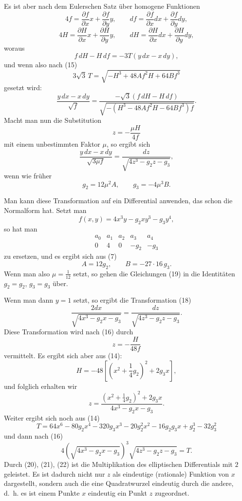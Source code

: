 \documentclass[11pt]{article}
\begin{document}
Es ist aber nach dem Eulerschen Satz über homogene Funktionen
\[
4f=\frac{\partial f}{\partial x}x+\frac{\partial f}{\partial y}y,\qquad
df=\frac{\partial f}{\partial x}dx+\frac{\partial f}{\partial y}dy,
\]
\[
4H=\frac{\partial H}{\partial x}x+\frac{\partial H}{\partial y}y,\qquad
dH=\frac{\partial H}{\partial x}dx+\frac{\partial H}{\partial y}dy,
\]
woraus
\[
f\,dH-H\,df=-3T(y\,dx-x\,dy),
\]
und wenn also nach (15)
\begin{equation}
3\sqrt3\,T=\sqrt{-H^3+48Af^2H+64Bf^3}
\tag{16}
\end{equation}
gesetzt wird:
\[
\frac{y\,dx-x\,dy}{\sqrt f}=\frac{-\sqrt3(f\,dH-H\,df)}{\sqrt{-(H^3-48Af^2H-64Bf^3)f}}.
\]
Macht man nun die Substitution
\begin{equation}
z=-\frac{\mu H}{4f}
\tag{17}
\end{equation}
mit einem unbestimmten Faktor $\mu$, so ergibt sich
\begin{equation}
\frac{y\,dx-x\,dy}{\sqrt{3\mu f}}=\frac{dz}{\sqrt{4z^3-g_2z-g_3}},
\tag{18}
\end{equation}
wenn wie früher
\begin{equation}
g_2=12\mu^2A,\qquad g_3=-4\mu^3B.
\tag{19}
\end{equation}

Man kann diese Transformation auf ein Differential anwenden, das schon die Normalform hat. Setzt man
\[
f(x,y)=4x^3y-g_2xy^3-g_3y^4,
\]
so hat man
\[
\begin{array}{ccccc}
a_0&a_1&a_2&a_3&a_4\\
0&4&0&-g_2&-g_3
\end{array}
\]
zu ersetzen, und es ergibt sich aus (7)
\[
A=12g_2,
\qquad B=-27\cdot16\,g_3.
\]
Wenn man also $\mu=\frac1{12}$ setzt, so gehen die Gleichungen (19) in die Identitäten $g_2=g_2$, $g_3=g_3$ über.

Wenn man dann $y=1$ setzt, so ergibt die Transformation (18)
\begin{equation}
\frac{2dx}{\sqrt{4x^3-g_2x-g_3}}=\frac{dz}{\sqrt{4z^3-g_2z-g_3}}.
\tag{20}
\end{equation}
Diese Transformation wird nach (16) durch
\[
z=-\frac{H}{48f}
\]
vermittelt. Es ergibt sich aber aus (14):
\[
H=-48\left[\left(x^2+\frac14g_2\right)^2+2g_3x\right],
\]
und folglich erhalten wir
\begin{equation}
z=\frac{\left(x^2+\frac14g_2\right)^2+2g_3x}{4x^3-g_2x-g_3}.
\tag{21}
\end{equation}
Weiter ergibt sich noch aus (14)
\[
T=64x^6-80g_2x^4-320g_3x^3-20g_2^2x^2-16g_2g_3x+g_2^3-32g_3^2
\]
und dann nach (16)
\begin{equation}
4\left(\sqrt{4x^3-g_2x-g_3}\right)^3\sqrt{4z^3-g_2z-g_3}=T.
\tag{22}
\end{equation}
Durch (20), (21), (22) ist die Multiplikation des elliptischen Differentials mit $2$ geleistet. Es ist dadurch nicht nur $z$ als eindeutige (rationale) Funktion von $x$ dargestellt, sondern auch die eine Quadratwurzel eindeutig durch die andere, d.~h. es ist einem Punkte $x$ eindeutig ein Punkt $z$ zugeordnet.
\end{document}

